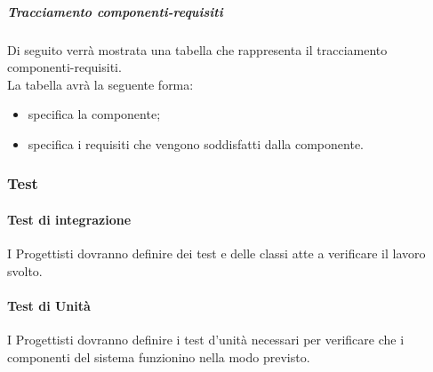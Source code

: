 \subparagraph{Tracciamento componenti-requisiti \\}
Di seguito verrà mostrata una tabella che rappresenta il tracciamento componenti-requisiti. \\
La tabella avrà la seguente forma:
\begin{itemize}
\item {}specifica la componente;
\item {}specifica i requisiti che vengono soddisfatti dalla componente.
\end{itemize}

\subsubsection{Test}

\paragraph{Test di integrazione \\}
\label{}
I Progettisti dovranno definire dei test e delle classi atte a verificare il lavoro svolto. 

\paragraph{Test di Unità \\}
\label{}
I Progettisti dovranno definire i test d'unità necessari per verificare che i componenti del sistema funzionino nella modo previsto.

